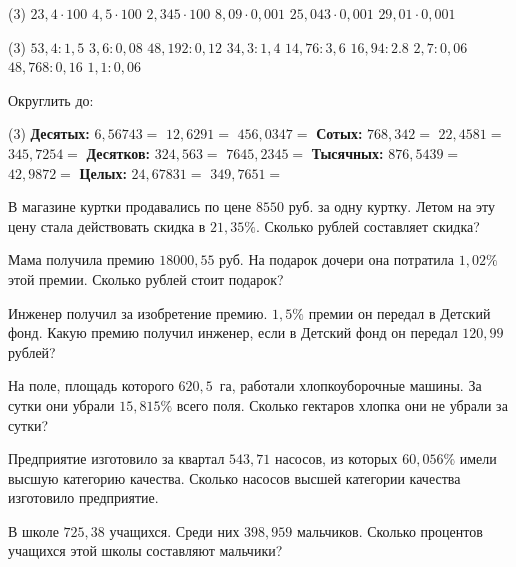 \begin{class}[number=5]
	\begin{listofex}
		\item \begin{tasks}(3)
			\task \( 23,4\cdot100 \)
			\task\( 4,5 \cdot100 \)
			\task \( 2,345\cdot100 \)
			\task\( 8,09\cdot0,001 \) 
			\task\( 25,043 \cdot0,001  \)
			\task\( 29,01\cdot0,001   \)
		\end{tasks}
		\item \begin{tasks}(3)
			\task \( 53,4:1,5 \)
			\task \( 3,6 : 0,08  \)
			\task \( 48,192 : 0,12  \)
			\task \( 34,3:1,4 \)
			\task \( 14,76 : 3,6 \) 
			\task \( 16,94:2.8  \)
			\task \( 2,7 : 0,06 \) 
			\task \( 48,768: 0,16 \)
			\task \(  1,1:0,06 \)
		\end{tasks}
	\item Округлить до:
	\begin{tasks}(3)
		\task[] \textbf{Десятых:}
		\task[]
		\task[]
		\task \( 6,56743 = \)
		\task \( 12, 6291 = \)
		\task \( 456,0347 = \)
		\task[] \textbf{Сотых:}
		\task[]
		\task[]
		\task \( 768,342 = \)
		\task \( 22,4581 = \)
		\task \( 345,7254 = \)
		\task[] \textbf{Десятков:}
		\task[]
		\task[]
		\task \( 324,563 = \)
		\task \( 7645,2345 = \)
		\task[]
		\task[] \textbf{Тысячных:}
		\task[]
		\task[]
		\task \( 876,5439 = \)
		\task \( 42,9872 = \)
		\task[]
		\task[] \textbf{Целых:}
		\task[]
		\task[]
		\task \( 24,67831 = \)
		\task \( 349,7651 = \)
	\end{tasks}
	\item В магазине куртки продавались по цене \( 8550 \) руб. за одну куртку. Летом на эту цену стала действовать скидка в \( 21,35\% \). Сколько рублей составляет скидка?
	\item Мама получила премию \( 18000,55 \) руб. На подарок дочери она потратила \( 1,02\% \) этой премии. Сколько рублей стоит подарок?
	\item Инженер получил за изобретение премию. \( 1,5\% \) премии он передал в Детский фонд. Какую премию получил инженер, если в Детский фонд он передал \( 120,99 \) рублей?
	\item На поле, площадь которого \( 620,5 \)  га, работали хлопкоуборочные машины. За сутки они убрали \( 15,815\% \) всего поля. Сколько гектаров хлопка они не убрали за сутки?
	\item Предприятие изготовило за квартал \( 543,71 \) насосов, из которых \( 60,056\% \) имели высшую категорию качества. Сколько насосов высшей категории качества изготовило предприятие.
	\item В школе \( 725,38 \) учащихся. Среди них \( 398,959 \) мальчиков. Сколько процентов учащихся этой школы составляют мальчики?
	\end{listofex}
	
\end{class}

